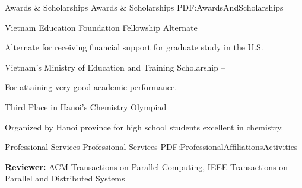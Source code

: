 \documentclass[letterpaper,MMMyyyy,nonstopmode]{simpleresumecv}
\begin{document}
\begin{Body}

\Section
{Awards \&\newline
Scholarships}
{Awards \& Scholarships}
{PDF:AwardsAndScholarships}

\BulletItem
Vietnam Education Foundation Fellowship Alternate
\hfill
{}
\begin{Detail}
\Item
Alternate for receiving financial support for graduate study in the U.S.
\end{Detail}

\Gap
\BulletItem
Vietnam's Ministry of Education and Training Scholarship 
\hfill
{} -- 
\begin{Detail}
\Item
For attaining very good academic performance. 
\end{Detail}

\Gap
\BulletItem
Third Place in Hanoi's Chemistry Olympiad
\hfill
{}
\begin{Detail}
\Item
Organized by Hanoi province for high school students excellent in chemistry.
\end{Detail}


\Section
{Professional Services}
{Professional Services}
{PDF:ProfessionalAffiliationsActivities}

\Entry
{\textbf{Reviewer:} ACM Transactions on Parallel Computing, 
IEEE Transactions on Parallel and Distributed Systems}



\end{Body}
\end{document}
